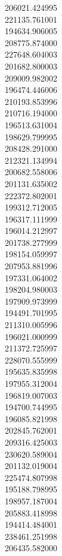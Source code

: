 206021.424995\\
221135.761001\\
194634.906005\\
208775.874000\\
227648.604003\\
201682.800003\\
209009.982002\\
196474.446006\\
210193.853996\\
210716.194000\\
196513.631004\\
198629.799995\\
208428.291000\\
212321.134994\\
200682.558006\\
201131.635002\\
222372.802001\\
199312.712005\\
196317.111999\\
196014.212997\\
201738.277999\\
198154.059997\\
207953.881996\\
197331.064002\\
198204.980003\\
197909.973999\\
194491.701995\\
211310.005996\\
196021.000999\\
211372.725997\\
228070.555999\\
195635.835998\\
197955.312004\\
196819.007003\\
194700.744995\\
196085.821998\\
202845.762001\\
209316.425003\\
230620.589004\\
201132.019004\\
225474.807998\\
195188.798995\\
198957.187004\\
205883.418998\\
194414.484001\\
238461.251998\\
206435.582000\\
